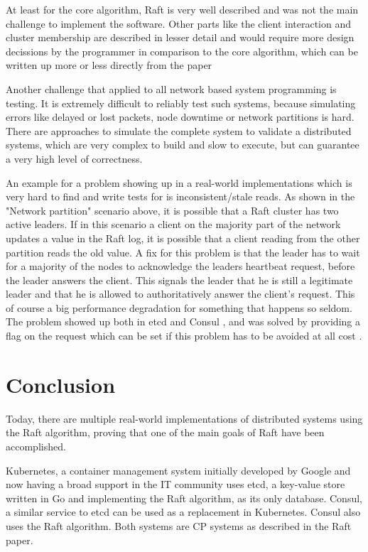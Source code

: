 At least for the core algorithm, Raft is very well described and was not the main challenge to implement the software.
Other parts like the client interaction and cluster membership are described in lesser detail and would require more design decissions by the programmer
in comparison to the core algorithm, which can be written up more or less directly from the paper

Another challenge that applied to all network based system programming is testing. It is extremely difficult to reliably test such systems, because simulating errors like
delayed or lost packets, node downtime or network partitions is hard. There are approaches to simulate the complete system to validate a distributed systems,
which are very complex to build and slow to execute, but can guarantee a very high level of correctness\cite{foundationdb_testing}.

An example for a problem showing up in a real-world implementations which is very hard to find and write tests for is inconsistent/stale reads. As shown in the "Network partition" scenario above, it is possible that a Raft cluster has two active leaders. If in this scenario a client on the majority part of the network updates a value in the Raft log, it is possible that a client reading from the other partition reads the old value. A fix for this problem is that the leader has to wait for a majority of the nodes to acknowledge the leaders heartbeat request, before the leader answers the client. This signals the leader that he is still a legitimate leader and that he is allowed to authoritatively answer the client's request.  This of course a big performance degradation for something that happens so seldom. The problem showed up both in etcd and Consul \cite{aphyr_call_me_maybe}, and was solved by providing a flag on the request which can be set if this problem has to be avoided at all cost \cite{etcd_consistency} \cite{consul_consistency}.


\section{Conclusion}
Today, there are multiple real-world implementations of distributed systems using the Raft algorithm, proving that one of the main goals of Raft have been accomplished.

Kubernetes, a container management system initially developed by Google and now having a broad support in the IT community uses etcd, a key-value store written in Go and implementing the Raft algorithm, as its only database. Consul, a similar service to etcd can be used as a replacement in Kubernetes. Consul also uses the Raft algorithm.
Both systems are CP systems as described in the Raft paper.

